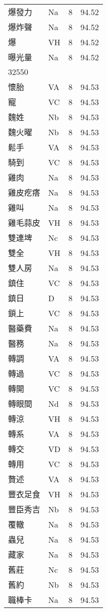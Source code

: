 \documentclass[twocolumn]{book}
\begin{document}
\begin{supertabular}{llrr}
爆發力 & Na & 8 &  94.52\\
爆炸聲 & Na & 8 &  94.52\\
爆 & VH & 8 &  94.52\\
曝光量 & Na & 8 &  94.52\\
32550\\
懷胎 & VA & 8 &  94.53\\
寵 & VC & 8 &  94.53\\
魏姓 & Nb & 8 &  94.53\\
魏火曜 & Nb & 8 &  94.53\\
鬆手 & VA & 8 &  94.53\\
騎到 & VC & 8 &  94.53\\
雞肉 & Na & 8 &  94.53\\
雞皮疙瘩 & Na & 8 &  94.53\\
雞叫 & Na & 8 &  94.53\\
雞毛蒜皮 & VH & 8 &  94.53\\
雙連埤 & Nc & 8 &  94.53\\
雙全 & VH & 8 &  94.53\\
雙人房 & Na & 8 &  94.53\\
鎮住 & VC & 8 &  94.53\\
鎮日 & D & 8 &  94.53\\
鎖上 & VC & 8 &  94.53\\
醫藥費 & Na & 8 &  94.53\\
醫務 & Na & 8 &  94.53\\
轉調 & VA & 8 &  94.53\\
轉過 & VC & 8 &  94.53\\
轉開 & VC & 8 &  94.53\\
轉眼間 & Nd & 8 &  94.53\\
轉涼 & VH & 8 &  94.53\\
轉系 & VA & 8 &  94.53\\
轉交 & VD & 8 &  94.53\\
轉用 & VC & 8 &  94.53\\
贅述 & VA & 8 &  94.53\\
豐衣足食 & VH & 8 &  94.53\\
豐臣秀吉 & Nb & 8 &  94.53\\
覆轍 & Na & 8 &  94.53\\
蟲兒 & Na & 8 &  94.53\\
藏家 & Na & 8 &  94.53\\
舊莊 & Nc & 8 &  94.53\\
舊約 & Nb & 8 &  94.53\\
職棒卡 & Na & 8 &  94.53\\

\end{supertabular}
\end{document}
